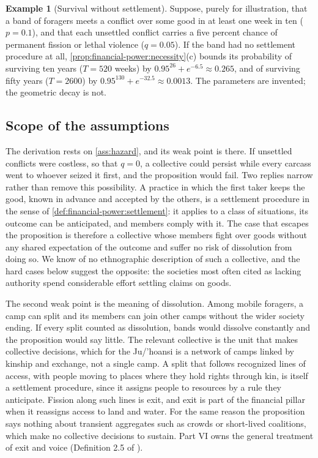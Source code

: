 \documentclass[11pt,letterpaper]{article}
\theoremstyle{definition}
\newtheorem{example}[theorem]{Example}
\theoremstyle{remark}
\begin{document}
\begin{example}[Survival without settlement]
\label{ex:survival}
Suppose, purely for illustration, that a band of foragers meets a conflict over some good in at least one week in ten ($p=0.1$), and that each unsettled conflict carries a five percent chance of permanent fission or lethal violence ($q=0.05$). If the band had no settlement procedure at all, \cref{prop:financial-power:necessity}(c) bounds its probability of surviving ten years ($T=520$ weeks) by $0.95^{26}+e^{-6.5}\approx 0.265$, and of surviving fifty years ($T=2600$) by $0.95^{130}+e^{-32.5}\approx 0.0013$. The parameters are invented; the geometric decay is not.
\end{example}

\subsection{Scope of the assumptions}

The derivation rests on \cref{ass:hazard}, and its weak point is there. If unsettled conflicts were costless, so that $q=0$, a collective could persist while every carcass went to whoever seized it first, and the proposition would fail. Two replies narrow rather than remove this possibility. A practice in which the first taker keeps the good, known in advance and accepted by the others, is a settlement procedure in the sense of \cref{def:financial-power:settlement}: it applies to a class of situations, its outcome can be anticipated, and members comply with it. The case that escapes the proposition is therefore a collective whose members fight over goods without any shared expectation of the outcome and suffer no risk of dissolution from doing so. We know of no ethnographic description of such a collective, and the hard cases below suggest the opposite: the societies most often cited as lacking authority spend considerable effort settling claims on goods.

The second weak point is the meaning of dissolution. Among mobile foragers, a camp can split and its members can join other camps without the wider society ending. If every split counted as dissolution, bands would dissolve constantly and the proposition would say little. The relevant collective is the unit that makes collective decisions, which for the Ju/'hoansi is a network of camps linked by kinship and exchange, not a single camp. A split that follows recognized lines of access, with people moving to places where they hold rights through kin, is itself a settlement procedure, since it assigns people to resources by a rule they anticipate. Fission along such lines is exit, and exit is part of the financial pillar when it reassigns access to land and water. For the same reason the proposition says nothing about transient aggregates such as crowds or short-lived coalitions, which make no collective decisions to sustain. Part VI owns the general treatment of exit and voice (Definition 2.5 of \citealt{long2026productive}).
\end{document}
